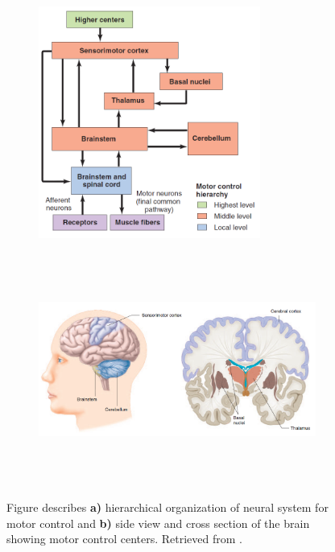 \begin{figure}[t!]
    \centering
    \begin{subfigure}[t]{0.95\textwidth}
        \centering
        \includegraphics[height=3in]{Images/introduction/control.png}
        \caption{}
    \end{subfigure}%
    
    \begin{subfigure}[t]{0.95\textwidth}
        \centering
        \includegraphics[height=3in]{Images/introduction/control2.png}
        \caption{}
    \end{subfigure}
    \caption{Figure describes \textbf{a)} hierarchical organization of neural system for motor control and \textbf{b)} side view and cross section of the brain showing motor control centers. Retrieved from \citet{Widmaier2014}.}
\label{fig:brain_centers}
\end{figure}

